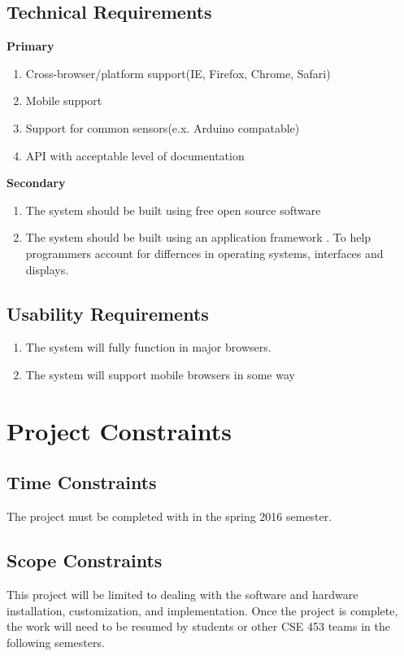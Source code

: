   \subsection{Technical Requirements}
  \textbf{Primary}
  \begin{enumerate}
    \item{}Cross-browser/platform support(IE, Firefox, Chrome, Safari)
    \item{}Mobile support
    \item{}Support for common sensors(e.x. Arduino compatable)
    \item{}API with acceptable level of documentation
  \end{enumerate}
  \textbf{Secondary}
  \begin{enumerate}
    \item{}The system should be built using free open source software
    \item{}The system should be built using an application framework . To help programmers account for differnces in operating systems, interfaces and displays.
  \end{enumerate}
  \subsection{Usability Requirements}
  \begin{enumerate}
    \item{}The system will fully function in major browsers.
    \item{}The system will support mobile browsers in some way
  \end{enumerate}
  \section{Project Constraints}
  \subsection{Time Constraints} The project must be completed with in the spring 2016 semester.

  \subsection{Scope Constraints} This project will be limited to dealing with the software and hardware installation, customization, and implementation. Once the project is complete, the work will need to be resumed by students or other CSE 453 teams in the following semesters.



